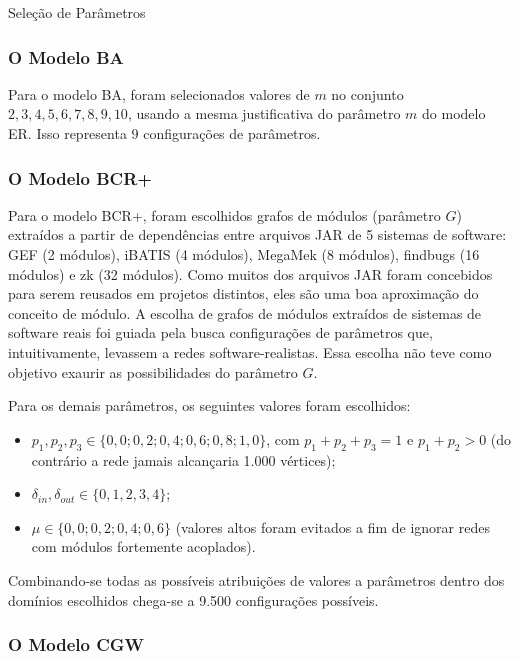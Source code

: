 \begin{section}{Seleção de Parâmetros}
\subsubsection{O Modelo BA}

Para o modelo BA, foram selecionados valores de $m$ no conjunto ${2, 3, 4, 5, 6, 7, 8, 9, 10}$, usando a mesma justificativa do parâmetro $m$ do modelo ER. Isso representa 9 configurações de parâmetros.

\subsubsection{O Modelo BCR+}

Para o modelo BCR+, foram escolhidos grafos de módulos (parâmetro $G$) extraídos a partir de dependências entre arquivos JAR de 5 sistemas de software: GEF (2 módulos), iBATIS (4 módulos), MegaMek (8 módulos), findbugs (16 módulos) e zk (32 módulos). Como muitos dos arquivos JAR foram concebidos para serem reusados em projetos distintos, eles são uma boa aproximação do conceito de módulo. A escolha de grafos de módulos extraídos de sistemas de software reais foi guiada pela busca configurações de parâmetros que, intuitivamente, levassem a redes software-realistas. Essa escolha não teve como objetivo exaurir as possibilidades do parâmetro $G$.

Para os demais parâmetros, os seguintes valores foram escolhidos:

\begin{itemize}
	\item $p_1, p_2, p_3 \in \{0,0; 0,2; 0,4; 0,6; 0,8; 1,0\}$, com $p_1 + p_2 + p_3 = 1$ e $p_1 + p_2 > 0$ (do contrário a rede jamais alcançaria 1.000 vértices);
	\item $\delta_{in}, \delta_{out} \in \{0, 1, 2, 3, 4\}$;
	\item $\mu \in \{0,0; 0,2; 0,4; 0,6\}$ (valores altos foram evitados a fim de ignorar redes com módulos fortemente acoplados).
\end{itemize}

Combinando-se todas as possíveis atribuições de valores a parâmetros dentro dos domínios escolhidos chega-se a 9.500 configurações possíveis.

\subsubsection{O Modelo CGW}


\end{section}
